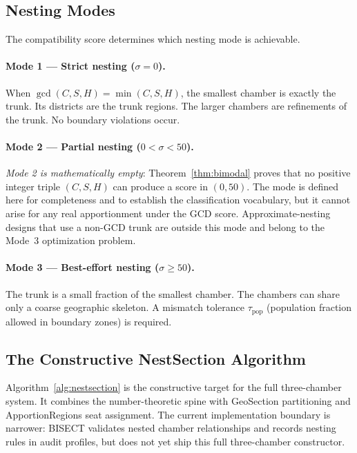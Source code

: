 \subsection{Nesting Modes}

The compatibility score determines which nesting mode is achievable.

\paragraph{Mode 1 --- Strict nesting ($\sigma = 0$).}
When $\gcd(C,S,H) = \min(C,S,H)$, the smallest chamber is exactly the trunk.
Its districts are the trunk regions.  The larger chambers are refinements of
the trunk.  No boundary violations occur.

\paragraph{Mode 2 --- Partial nesting ($0 < \sigma < 50$).}
\emph{Mode 2 is mathematically empty}: Theorem~\ref{thm:bimodal} proves that
no positive integer triple $(C, S, H)$ can produce a score in $(0, 50)$.
The mode is defined here for completeness and to establish the classification
vocabulary, but it cannot arise for any real apportionment under the GCD
score.  Approximate-nesting designs that use a non-GCD trunk are outside this
mode and belong to the Mode~3 optimization problem.

\paragraph{Mode 3 --- Best-effort nesting ($\sigma \geq 50$).}
The trunk is a small fraction of the smallest chamber.  The chambers can
share only a coarse geographic skeleton.  A mismatch tolerance $\tau_\text{pop}$
(population fraction allowed in boundary zones) is required.

\subsection{The Constructive NestSection Algorithm}

Algorithm~\ref{alg:nestsection} is the constructive target for the full
three-chamber system.  It combines the number-theoretic spine with GeoSection
partitioning and ApportionRegions seat assignment.  The current implementation
boundary is narrower: BISECT validates nested chamber relationships and records
nesting rules in audit profiles, but does not yet ship this full
three-chamber constructor.

